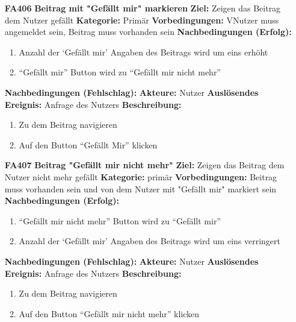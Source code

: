 \documentclass[parskip=full]{scrartcl}
\begin{document}
\begin{itemize}[nosep]
			\item[\textbf{FA406}]\textbf{Beitrag mit "Gefällt mir" markieren}
						\newline \textbf{Ziel:} Zeigen das Beitrag dem Nutzer gefällt
						\newline \textbf{Kategorie:} Primär
						\newline \textbf{Vorbedingungen:} VNutzer muss angemeldet sein, Beitrag muss vorhanden sein
						\newline \textbf{Nachbedingungen (Erfolg):} 
						\begin{enumerate}[nosep]
							\item Anzahl der ‘Gefällt mir’ Angaben des Beitrags wird um eins erhöht
							\item “Gefällt mir” Button wird zu “Gefällt mir nicht mehr”
						\end{enumerate}
						\textbf{Nachbedingungen (Fehlschlag):}
						\newline \textbf{Akteure:} Nutzer
						\newline \textbf{Auslösendes Ereignis:} Anfrage des Nutzers
						\newline \textbf{Beschreibung:}
						\begin{enumerate}[nosep]
							\item Zu dem Beitrag navigieren
							\item Auf den Button “Gefällt Mir” klicken\\
						\end{enumerate}
					
					
						\item[\textbf{FA407}]\textbf{Beitrag "Gefällt mir nicht mehr"}
						\newline \textbf{Ziel:} Zeigen das Beitrag dem Nutzer nicht mehr gefällt
						\newline \textbf{Kategorie:} primär
						\newline \textbf{Vorbedingungen:} Beitrag muss vorhanden sein und von dem Nutzer mit "Gefällt mir" markiert sein
						\newline \textbf{Nachbedingungen (Erfolg):} 
						\begin{enumerate}[nosep]
							\item “Gefällt mir nicht mehr” Button wird zu “Gefällt mir”
							\item Anzahl der ‘Gefällt mir’ Angaben des Beitrags wird um eins  verringert 
						\end{enumerate}
						\textbf{Nachbedingungen (Fehlschlag):}
						\newline \textbf{Akteure:} Nutzer
						\newline \textbf{Auslösendes Ereignis:} Anfrage des Nutzers
						\newline \textbf{Beschreibung:}
						\begin{enumerate}[nosep]
							\item Zu dem Beitrag navigieren
							\item Auf den Button “Gefällt mir nicht mehr” klicken\\
						\end{enumerate}
						

\end{itemize}
\end{document}
